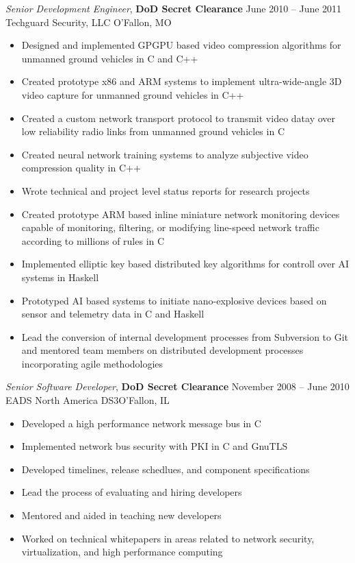 \documentclass[margin,line]{resume}
\begin{document}
\begin{resume}
{\sl Senior Development Engineer}, \textbf{\small DoD Secret Clearance}   \hfill
June 2010 -- June 2011\\
Techguard Security, LLC \hfill  O'Fallon, MO
\begin{itemize} \itemsep -2pt %
\small\item Designed and implemented GPGPU based video compression algorithms
    for unmanned ground vehicles in C and C++
\small\item Created prototype x86 and ARM systems to implement ultra-wide-angle
    3D video capture for unmanned ground vehicles in C++
\small\item Created a custom network transport protocol to transmit video datay
    over low reliability radio links from unmanned ground vehicles in C
\small\item Created neural network training systems to analyze subjective video
    compression quality in C++
\small\item Wrote technical and project level status reports for research
    projects
\small\item Created prototype ARM based inline miniature network monitoring
    devices capable of monitoring, filtering, or modifying line-speed network
    traffic according to millions of rules in C
\small\item Implemented elliptic key based distributed key algorithms for
    controll over AI systems in Haskell
\small\item Prototyped AI based systems to initiate nano-explosive devices
    based on sensor and telemetry data in C and Haskell
\small\item Lead the conversion of internal development processes from
    Subversion to Git and mentored team members on distributed development
    processes incorporating agile methodologies
\end{itemize}

{\sl Senior Software Developer}, \textbf{\small DoD Secret Clearance}   \hfill
November 2008 -- June 2010\\
EADS North America DS3\hfill  O'Fallon, IL
\begin{itemize} \itemsep -2pt %
\small\item Developed a high performance network message bus in C
\small\item Implemented network bus security with PKI in C and GnuTLS
\small\item Developed timelines, release schedlues, and component
    specifications
\small\item Lead the process of evaluating and hiring developers
\small\item Mentored and aided in teaching new developers
\small\item Worked on technical whitepapers in areas related to network
    security, virtualization, and high performance computing
\end{itemize}


\end{resume}
\end{document}
